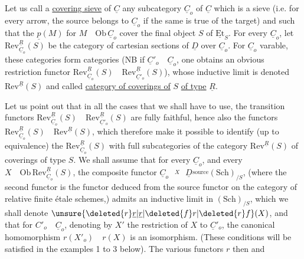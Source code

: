 Let us call a \uline{covering sieve} of $\underline{C}$ any  subcategory $\underline{C}_o$ of $\underline{C}$ which is a sieve (i.e. for every arrow, the source belongs to $\underline{C}_o$ if the same is true of the target) and such that the $\underline{p}(M)$ for $M\quad\mathrm{Ob}\,\underline{C}_o$ cover the final object $S$ of $\underline{\mathrm{Et}}_S$. For every $\underline{C}_o$, let $\mathrm{Rev}^{\underline{R}}_{\underline{C}_o}(S)$ be the category of cartesian sections of $\underline{D}$ over $\underline{C}_o$. For $\underline{C}_o$ varable, these categories form  categories (NB if $\underline{C}'_o\quad\underline{C}_o$, one obtains an obvious restriction functor $\mathrm{Rev}^{\underline{R}}_{\underline{C}_o}(S)\quad\mathrm{Rev}^{\underline{R}}_{\underline{C}'_o}(S)$),  whose inductive limit is denoted $\mathrm{Rev}^{\underline{R}}(S)$ and called \uline{category of coverings of} $S$ \uline{of type} $\underline{R}$.

Let us point out that in all the cases that we shall have to use, the transition functors $\mathrm{Rev}^{\underline{R}}_{\underline{C}_o}(S)\quad\mathrm{Rev}^{\underline{R}}_{\underline{C}'_o}(S)$ are fully faithful, hence also the functors $\mathrm{Rev}^{\underline{R}}_{\underline{C}_o}(S)\quad\mathrm{Rev}^{\underline{R}}(S)$, which therefore make it possible to identify (up to equivalence) the $\mathrm{Rev}^{\underline{R}}_{\underline{C}_o}(S)$ with full subcategories of the category $\mathrm{Rev}^{\underline{R}}(S)$ of coverings of type $S$. We shall assume  that for every $\underline{C}_o$,  and every $X\quad\mathrm{Ob}\,\mathrm{Rev}^{\underline{R}}_{\underline{C}_o}(S)$, the composite functor $\underline{C}_o\overset{X}{\qquad}\underline{D}\overset{\mathrm{source}}{\qquad}(\mathrm{Sch})_{/S}$, (where the second functor is the functor deduced from the source functor on the category of relative finite étale schemes,) admits an inductive limit in $(\mathrm{Sch})_{/S}$, which we shall denote $\unsure{\deleted{r}\underline{r}|\underline{r}|\deleted{f}r|\deleted{r}f}(X)$, and that for $C'_o\quad\underline{C}_o$, denoting by $X'$ the restriction of $X$ to $\underline{C}'_o$, the canonical homomorphism $r(X'_o)\quad r(X)$ is an isomorphism. (These conditions will be satisfied in the examples  1 to 3 below). The various functors $r$ then  and
